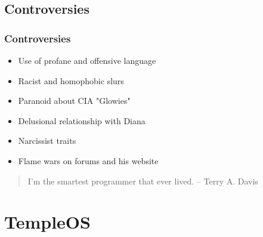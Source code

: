 \documentclass{beamer}
\begin{document}
	\subsection{Controversies}
	\begin{frame}
		\frametitle{Controversies}
		\begin{itemize}
			\item Use of profane and offensive language

			\item Racist and homophobic slurs

			\item Paranoid about CIA "Glowies"

			\item Delusional relationship with Diana

			\item Narcissist traits

			\item Flame wars on forums and his website
		\end{itemize}

		\vspace{1em}
		\begin{quote}
			I'm the smartest programmer that ever lived. \flushright -- Terry A. Davis
		\end{quote}
	\end{frame}

	\section[TOS]{TempleOS}
\end{document}
